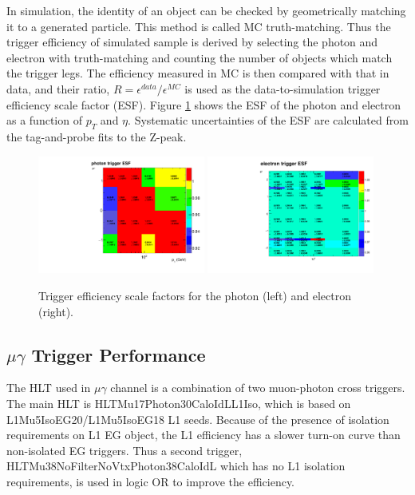 \documentclass[thesis.tex]{subfiles}
\renewcommand\_{\textunderscore\allowbreak}
\begin{document}
In simulation, the identity of an object can be checked by geometrically matching it to a generated particle. 
This method is called MC truth-matching. 
Thus the trigger efficiency of simulated sample is derived by selecting the photon and electron with truth-matching and counting the number of objects which match the trigger legs. 
The efficiency measured in MC is then compared with that in data, and their ratio, $R = \epsilon^{data}/\epsilon^{MC}$ is used as the data-to-simulation trigger efficiency scale factor (ESF). 
Figure \ref{fig:egtriggerESF} shows the ESF of the photon and electron as a function of $p_{T}$ and $\eta$. 
Systematic uncertainties of the ESF are calculated from the tag-and-probe fits to the Z-peak. 

\begin{figure}[tb]
  \centering
  \includegraphics[width=0.49\textwidth]{Figures/egTrigger_LeadingESF.pdf}
  \includegraphics[width=0.49\textwidth]{Figures/egTrigger_TrailingESF.pdf}
 \caption{Trigger efficiency scale factors for the photon (left) and electron (right). }
  \label{fig:egtriggerESF}
\end{figure}


\subsection{$\mu\gamma$ Trigger Performance}

The HLT used in $\mu\gamma$ channel is a combination of two muon-photon cross triggers.
The main HLT is HLT\_Mu17\_Photon30\_CaloIdL\_L1Iso, which is based on L1\_Mu5\_IsoEG20/L1\_Mu5\_IsoEG18 L1 seeds. 
Because of the presence of isolation requirements on L1 EG object, the L1 efficiency has a slower turn-on curve than non-isolated EG triggers.
Thus a second trigger, HLT\_Mu38NoFilterNoVtx\_Photon38\_CaloIdL which has no L1 isolation requirements, is used in logic OR to improve the efficiency.
\end{document}
